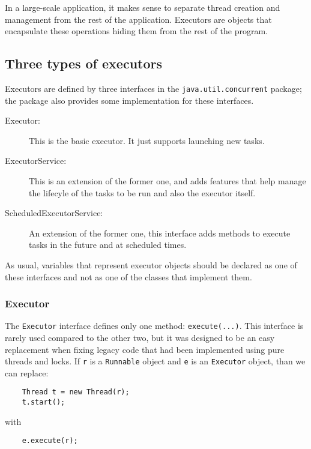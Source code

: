 In a large-scale application, it makes sense to separate thread
creation and management from the rest of the application. Executors
are objects that encapsulate these operations hiding them from the
rest of the program. 

\subsection{Three types of executors}
\label{sec:three-types-exec}

Executors are defined by three interfaces in the
\verb+java.util.concurrent+ package; the package also provides some
implementation for these interfaces. 

\begin{description}
\item[Executor: ] This is the basic executor. It just supports
  launching new tasks.
\item[ExecutorService: ] This is an extension of the former one, and
  adds features that help manage the lifecyle of the tasks to be run
  and also the executor itself.
\item[ScheduledExecutorService: ] An extension of the former one, this
  interface adds methods to execute tasks in the future and at
  scheduled times. 
\end{description}

As usual, variables that represent executor objects should be declared
as one of these interfaces and not as one of the classes that
implement them.

\subsubsection{Executor}
\label{sec:executor}

The \verb+Executor+ interface defines only one method:
\verb+execute(...)+. This interface is rarely used compared to the
other two, but it was designed to be an easy replacement when fixing
legacy code that had been implemented using pure threads and locks. If
\verb+r+ is a \verb+Runnable+ object and \verb+e+ is an
\verb+Executor+ object, than we can replace: 

\begin{verbatim}
    Thread t = new Thread(r);
    t.start();
\end{verbatim}

with 

\begin{verbatim}
    e.execute(r);
\end{verbatim}

